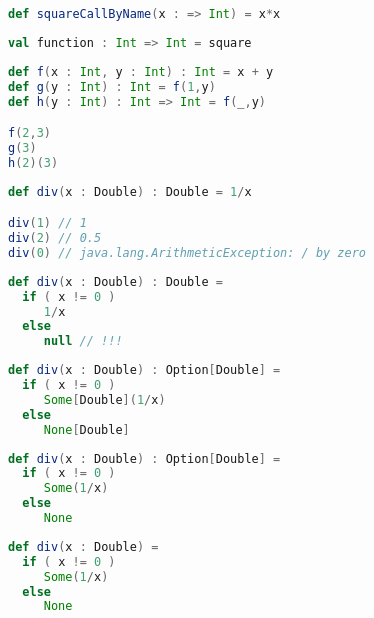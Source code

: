 \documentclass[10pt]{beamer}
\begin{document}
{\begin{frame}[fragile]
\begin{lstlisting}[language=Scala, basicstyle=\ttfamily]
def squareCallByName(x : => Int) = x*x
\end{lstlisting}
\end{frame}


\begin{frame}[fragile]
\begin{lstlisting}[language=Scala, basicstyle=\ttfamily]
val function : Int => Int = square
\end{lstlisting}
\end{frame}

\begin{frame}[fragile]
\begin{lstlisting}[language=Scala, basicstyle=\ttfamily]
def f(x : Int, y : Int) : Int = x + y
def g(y : Int) : Int = f(1,y)
def h(y : Int) : Int => Int = f(_,y)

f(2,3)
g(3)
h(2)(3)
\end{lstlisting}
\end{frame}

}

\begin{frame}[fragile]
\begin{lstlisting}[language=Scala, basicstyle=\ttfamily]
def div(x : Double) : Double = 1/x

div(1) // 1 
div(2) // 0.5 
div(0) // java.lang.ArithmeticException: / by zero
\end{lstlisting}
\end{frame}


\begin{frame}[fragile]
\begin{lstlisting}[language=Scala, basicstyle=\ttfamily]
def div(x : Double) : Double = 
  if ( x != 0 ) 
     1/x 
  else 
     null // !!!
\end{lstlisting}
\end{frame}

\begin{frame}[fragile]
\begin{lstlisting}[language=Scala, basicstyle=\ttfamily]
def div(x : Double) : Option[Double] =
  if ( x != 0 ) 
     Some[Double](1/x) 
  else 
     None[Double]
\end{lstlisting}
\end{frame}
\begin{frame}[fragile]
\begin{lstlisting}[language=Scala, basicstyle=\ttfamily]
def div(x : Double) : Option[Double] =
  if ( x != 0 ) 
     Some(1/x) 
  else 
     None
\end{lstlisting}
\end{frame}
\begin{frame}[fragile]
\begin{lstlisting}[language=Scala, basicstyle=\ttfamily]
def div(x : Double) = 
  if ( x != 0 ) 
     Some(1/x) 
  else 
     None
\end{lstlisting}
\end{frame}
\end{document}

